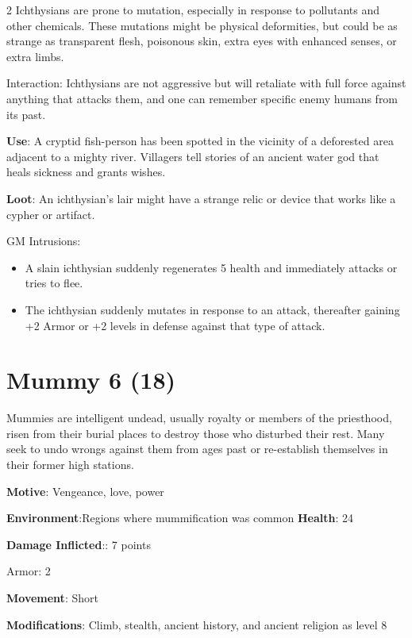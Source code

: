 \begin{multicols}{2}
Ichthysians are prone to mutation, especially in response to pollutants and other chemicals. These mutations might be physical deformities, but could be as strange as transparent flesh, poisonous skin, extra eyes with enhanced senses, or extra limbs.

Interaction: Ichthysians are not aggressive but will retaliate with full force against anything that attacks them, and one can remember specific enemy humans from its past.

\textbf{Use}: A cryptid fish-person has been spotted in the vicinity of a deforested area adjacent to a mighty river. Villagers tell stories of an ancient water god that heals sickness and grants wishes.

\textbf{Loot}: An ichthysian’s lair might have a strange relic or device that works like a cypher or artifact.

GM Intrusions:

\begin{itemize} 
\item A slain ichthysian suddenly regenerates 5 health and immediately attacks or tries to flee.

\item The ichthysian suddenly mutates in response to an attack, thereafter gaining +2 Armor or +2 levels in defense against that type of attack.
\end{itemize}

\section{Mummy 6 (18)}

Mummies are intelligent undead, usually royalty or members of the priesthood, risen from their burial places to destroy those who disturbed their rest. Many seek to undo wrongs against them from ages past or re-establish themselves in their former high stations. 

\textbf{Motive}: Vengeance, love, power

\textbf{Environment}:Regions where mummification was common \textbf{Health}: 24

\textbf{Damage Inflicted}:: 7 points

Armor: 2

\textbf{Movement}: Short

\textbf{Modifications}: Climb, stealth, ancient history, and ancient religion as level 8 


\end{multicols}
